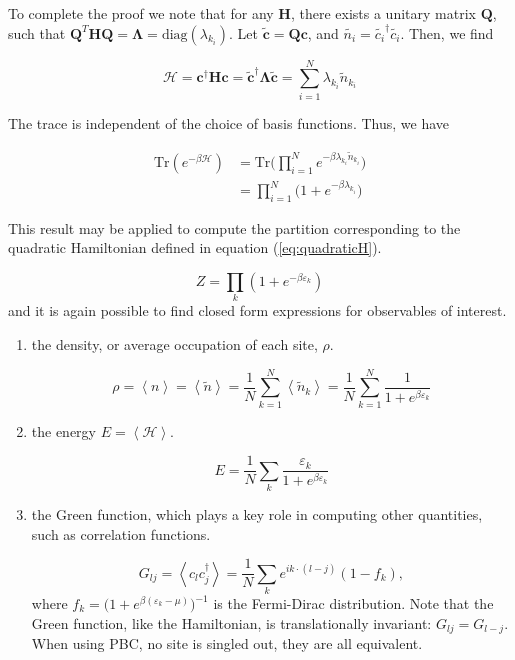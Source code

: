 \documentclass[10pt, twocolumn, twoside]{article}
\begin{document}
To complete the proof we note that for any $\bm H$, there exists a unitary matrix $\bm Q$, such that $\bm Q^T \bm H \bm Q = \bm \Lambda = \text{diag}(\lambda_{k_i})$. Let $\tilde{\bm c} = \bm Q \bm c$, and $\tilde{n_i} = \tilde{c_i}^\dagger \tilde{c_i}$. Then, we find

\begin{equation}
\mathcal{H} = \bm c^\dagger \bm H \bm c = \bm \tilde{\bm c}^\dagger \bm \Lambda \tilde{\bm c} = \sum_{i=1}^N \lambda_{k_i} \tilde{n}_{k_i}
\end{equation}

The trace is independent of the choice of basis functions. Thus, we have

\begin{equation}
\begin{split}
\text{Tr} ( e^{-\beta \mathcal{H} } ) &= \text{Tr} \bigg( \prod_{i=1}^N e^{-\beta \lambda_{k_i} \tilde{n}_{k_i} } \bigg) \\
&= \prod_{i=1}^N \bigg( 1 + e^{-\beta \lambda_{k_i} } \bigg)
\end{split}
\end{equation}

This result may be applied to compute the partition corresponding to the quadratic Hamiltonian defined in equation (\ref{eq:quadraticH}).

\begin{equation}
Z = \prod_k ( 1 + e^{-\beta \varepsilon_k} )
\end{equation}
and it is again possible to find closed form expressions for observables of interest.

\begin{enumerate}
\item the density, or average occupation of each site, $\rho$.

\begin{equation}
\rho = \left\langle n \right\rangle = \left\langle \tilde{n} \right\rangle = \frac{1}{N} \sum_{k=1}^N \left\langle \tilde{n}_k \right\rangle  = \frac{1}{N} \sum_{k=1}^N  \frac{1}{1 + e^{\beta\varepsilon_k}}
\end{equation}

\item the energy $E = \left\langle \mathcal{H} \right\rangle$.

\begin{equation}
E = \frac{1}{N} \sum_k \frac{\varepsilon_k}{1 + e^{\beta\varepsilon_k}}
\end{equation}

\item the Green function, which plays a key role in computing other quantities, such as correlation functions.

\begin{equation}
G_{lj} = \left\langle c_l c_j^\dagger \right\rangle = \frac{1}{N} \sum_k e^{ i k \cdot ( l - j ) } ( 1 - f_k ),
\end{equation}
where $f_k = \big(1 + e^{\beta(\varepsilon_k - \mu)} \big)^{-1}$ is the Fermi-Dirac distribution. Note that the Green function, like the Hamiltonian, is translationally invariant: $G_{lj} = G_{l-j}$. When using PBC, no site is singled out, they are all equivalent.
\end{enumerate}
\end{document}
